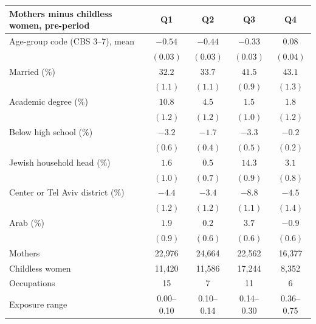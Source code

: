 \begin{tabular}{lcccc}
\toprule
Mothers minus childless women, pre-period & Q1 & Q2 & Q3 & Q4 \\
\midrule
Age-group code (CBS 3--7), mean & $-0.54$\sym{***} & $-0.44$\sym{***} & $-0.33$\sym{***} & $0.08$\sym{*} \\
 & $(0.03)$ & $(0.03)$ & $(0.03)$ & $(0.04)$ \\
Married (\%) & $32.2$\sym{***} & $33.7$\sym{***} & $41.5$\sym{***} & $43.1$\sym{***} \\
 & $(1.1)$ & $(1.1)$ & $(0.9)$ & $(1.3)$ \\
Academic degree (\%) & $10.8$\sym{***} & $4.5$\sym{***} & $1.5$ & $1.8$ \\
 & $(1.2)$ & $(1.2)$ & $(1.0)$ & $(1.2)$ \\
Below high school (\%) & $-3.2$\sym{***} & $-1.7$\sym{***} & $-3.3$\sym{***} & $-0.2$ \\
 & $(0.6)$ & $(0.4)$ & $(0.5)$ & $(0.2)$ \\
Jewish household head (\%) & $1.6$ & $0.5$ & $14.3$\sym{***} & $3.1$\sym{***} \\
 & $(1.0)$ & $(0.7)$ & $(0.9)$ & $(0.8)$ \\
Center or Tel Aviv district (\%) & $-4.4$\sym{***} & $-3.4$\sym{**} & $-8.8$\sym{***} & $-4.5$\sym{**} \\
 & $(1.2)$ & $(1.2)$ & $(1.1)$ & $(1.4)$ \\
Arab (\%) & $1.9$\sym{*} & $0.2$ & $3.7$\sym{***} & $-0.9$ \\
 & $(0.9)$ & $(0.6)$ & $(0.6)$ & $(0.6)$ \\
\midrule
Mothers & 22{,}976 & 24{,}664 & 22{,}562 & 16{,}377 \\
Childless women & 11{,}420 & 11{,}586 & 17{,}244 & 8{,}352 \\
Occupations & 15 & 7 & 11 & 6 \\
Exposure range & 0.00--0.10 & 0.10--0.14 & 0.14--0.30 & 0.36--0.75 \\
\bottomrule
\end{tabular}

